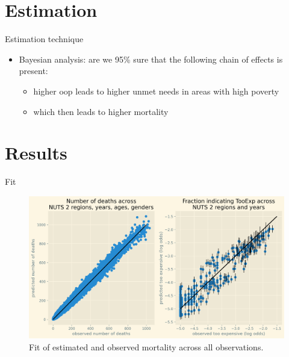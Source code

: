 \documentclass[presentation]{beamer}
\begin{document}
\section*{Estimation}
\label{sec:orge16d339}

\begin{frame}[label={sec:org611259e}]{Estimation technique}
\begin{itemize}
\item Bayesian analysis: are we 95\% sure that the following chain of effects is present:
\begin{itemize}
\item higher oop leads to higher unmet needs in areas with high poverty
\item which then leads to higher mortality
\end{itemize}
\end{itemize}
\end{frame}

\section*{Results}
\label{sec:org6ccb26c}

\begin{frame}[label={sec:org671f70d}]{Fit}
\begin{figure}[htbp]
\centering
\includegraphics[width=.9\linewidth]{./figures/fit_baseline_model.png}
\caption{\label{fig:ModelFit}Fit of estimated and observed mortality across all observations.}
\end{figure}
\end{frame}
\end{document}
